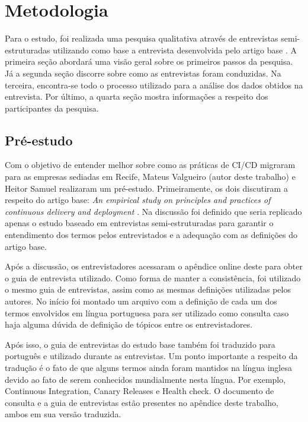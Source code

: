 
\chapter{Metodologia}

Para o estudo, foi realizada uma pesquisa qualitativa através de entrevistas semi-estruturadas utilizando como base a entrevista desenvolvida pelo artigo base \cite{empiricalStudy2016}. A primeira seção abordará uma visão geral sobre os primeiros passos da pesquisa.  Já a segunda seção discorre sobre como as entrevistas foram conduzidas. Na terceira, encontra-se todo o processo utilizado para a análise dos dados obtidos na entrevista. Por último, a quarta seção mostra informações a respeito dos participantes da pesquisa.


\section{Pré-estudo}

Com o objetivo de entender melhor sobre como as práticas de CI/CD migraram para as empresas sediadas em Recife, Mateus Valgueiro (autor deste trabalho) e Heitor Samuel realizaram um pré-estudo. Primeiramente, os dois discutiram a respeito do artigo base: \emph{An empirical study on principles and practices of continuous delivery and deployment} \cite{empiricalStudy2016}. Na discussão foi definido que seria replicado apenas o estudo baseado em entrevistas semi-estruturadas para garantir o entendimento dos termos pelos entrevistados e a adequação com as definições do artigo base. 

Após a discussão, os entrevistadores acessaram o apêndice online deste \cite{empiricalStudyOnlineAppendix} para obter o guia de entrevista utilizado. Como forma de manter a consistência, foi utilizado o mesmo guia de entrevistas, assim como as mesmas definições utilizadas pelos autores. No início foi montado um arquivo com a definição de cada um dos termos envolvidos em língua portuguesa para ser utilizado como consulta caso haja alguma dúvida de definição de tópicos entre os entrevistadores.

Após isso, o guia de entrevistas do estudo base \cite{empiricalStudyOnlineAppendix} também foi traduzido para português e utilizado durante as entrevistas. Um ponto importante a respeito da tradução é o fato de que alguns termos ainda foram mantidos na língua inglesa devido ao fato de serem conhecidos mundialmente nesta língua. Por exemplo, Continuous Integration, Canary Releases e Health check.
O documento de consulta e a guia de entrevistas estão presentes no apêndice deste trabalho, ambos em sua versão traduzida.

